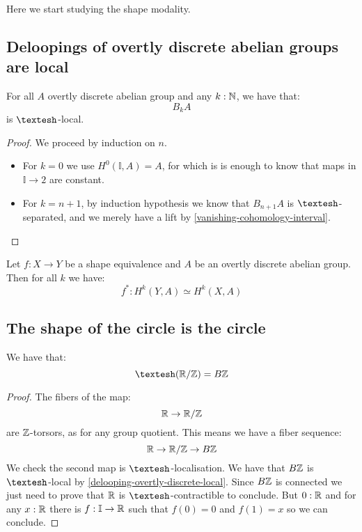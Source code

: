 Here we start studying the shape modality.

\subsection{Deloopings of overtly discrete abelian groups are local}

\begin{lemma}\label{delooping-overtly-discrete-local}
For all $A$ overtly discrete abelian group and any $k:\mathbb{N}$, we have that:
\[B_kA\]
is $\shape$-local.
\end{lemma}

\begin{proof}
We proceed by induction on $n$. 
\begin{itemize}
\item For $k=0$ we use $H^0(\mathbb{I},A) = A$, for which is is enough to know that maps in $\mathbb{I}\to 2$ are constant. 
\item For $k=n+1$, by induction hypothesis we know that $B_{n+1}A$ is $\shape$-separated, and we merely have a lift by \cref{vanishing-cohomology-interval}.
\end{itemize}
\end{proof}

\begin{corollary}
Let $f:X\to Y$ be a shape equivalence and $A$ be an overtly discrete abelian group. Then for all $k$ we have:
\[f^* : H^k(Y,A) \simeq H^k(X,A)\]
\end{corollary}


\subsection{The shape of the circle is the circle}

\begin{proposition}
We have that:
\[\shape (\R/\Z) = B\Z\]
\end{proposition}

\begin{proof}
The fibers of the map:
\[\mathbb{R}\to \mathbb{R}/\mathbb{Z}\]
are $\mathbb{Z}$-torsors, as for any group quotient. This means we have a fiber sequence:
\[\mathbb{R} \to \mathbb{R}/\mathbb{Z} \to B\mathbb{Z}\]
We check the second map is $\shape$-localisation. We have that $B\mathbb{Z}$ is $\shape$-local by \cref{delooping-overtly-discrete-local}. Since $B\mathbb{Z}$ is connected we just need to prove that $\mathbb{R}$ is $\shape$-contractible to conclude. But $0:\mathbb{R}$ and for any $x:\mathbb{R}$ there is $f:\mathbb{I}\to\mathbb{R}$ such that $f(0)=0$ and $f(1)=x$ so we can conclude.
\end{proof}


